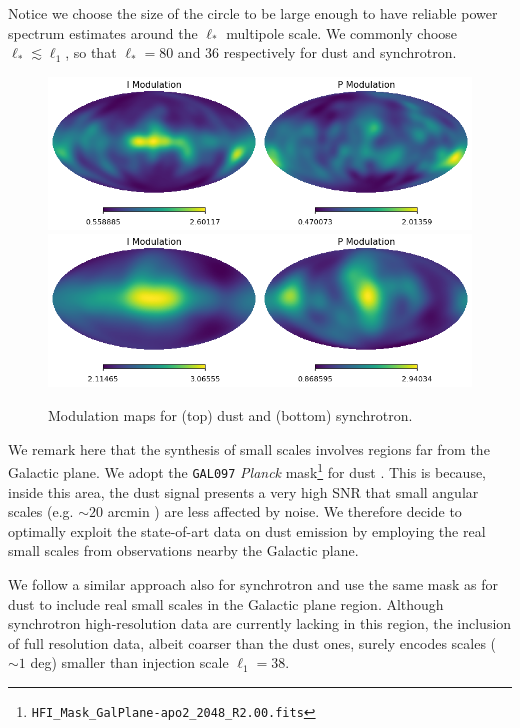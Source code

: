  Notice we choose  the size of the circle to be large enough to have reliable power spectrum estimates around the $\ell_* $ multipole scale. We commonly choose  $\ell_*\lesssim \ell_1$, so that $\ell_*=80$ and $36$ respectively for dust and synchrotron. 
 
 \begin{figure}
     \centering
     \includegraphics[width=2\columnwidth]{figures/mod_dust.png}\\
     
      \includegraphics[width=2\columnwidth]{figures/mod_synch.png}\\
     \caption{Modulation maps for (top) dust and  (bottom) synchrotron. }
     \label{fig:modulation_maps }
 \end{figure}
 

 
We remark here that the synthesis of small scales involves regions far from the Galactic plane.  We adopt the  \texttt{GAL097} \emph{Planck}  mask\footnote{\texttt{HFI\_Mask\_GalPlane-apo2\_2048\_R2.00.fits}} for dust . This is because, inside this area, the dust signal presents a very high SNR that small angular scales (e.g. $\sim20 $ arcmin ) are less affected by noise. We therefore decide to optimally exploit the state-of-art data on dust emission by employing the real small scales from observations nearby the Galactic plane.  

We follow a similar approach also for synchrotron and use the same mask as for dust to include real small scales in the Galactic plane region. Although synchrotron high-resolution data are currently lacking in this region, the inclusion of full resolution data, albeit coarser than the dust ones, surely encodes scales ($\sim 1$ deg) smaller   than   injection scale $\ell_1=38 $.  

